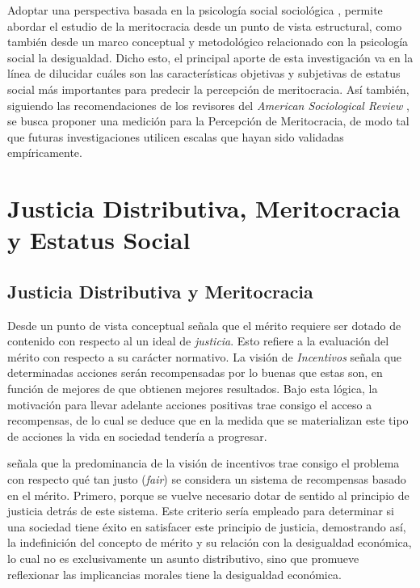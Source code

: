 \documentclass[12pt]{article}
\begin{document}
Adoptar una perspectiva basada en la psicología social sociológica \citep{Castillo2012}, permite abordar el estudio de la meritocracia desde un punto de vista estructural, como también desde un marco conceptual y metodológico relacionado con la psicología social la desigualdad. Dicho esto, el principal aporte de esta investigación va en la línea de dilucidar cuáles son las características objetivas y subjetivas de estatus social más importantes para predecir la percepción de meritocracia. Así también, siguiendo las recomendaciones de los revisores del \textit{American Sociological Review} \citep{Mustilloetal2018}, se busca proponer una medición para la Percepción de Meritocracia, de modo tal que futuras investigaciones utilicen escalas que hayan sido validadas empíricamente.  
  
\newpage
		
\section{Justicia Distributiva, Meritocracia y Estatus Social}
	
\subsection{Justicia Distributiva y Meritocracia}
	
Desde un punto de vista conceptual \citet{Sen2000} señala que el mérito requiere ser dotado de contenido con respecto al un ideal de \textit{justicia}. Esto refiere a la evaluación del mérito con respecto a su carácter normativo. La visión de \textit{Incentivos}  señala que determinadas acciones serán recompensadas por lo buenas que estas son, en función de mejores de que obtienen mejores resultados. Bajo esta lógica, la motivación para llevar adelante acciones positivas trae consigo el acceso a recompensas, de lo cual se deduce que en la medida que se materializan este tipo de acciones la vida en sociedad tendería a progresar. 
	
\citet{Sen2000} señala que la predominancia de la visión de incentivos trae consigo el problema con respecto qué tan justo (\textit{fair}) se considera un sistema de recompensas basado en el mérito. Primero, porque se vuelve necesario dotar de sentido al principio de justicia detrás de este sistema. Este criterio sería empleado para determinar si una sociedad tiene éxito en satisfacer este principio de justicia, demostrando así, la indefinición del concepto de mérito y su relación con la desigualdad económica, lo cual no es exclusivamente un asunto distributivo, sino que promueve reflexionar las implicancias morales tiene la desigualdad económica.
	
\end{document}
